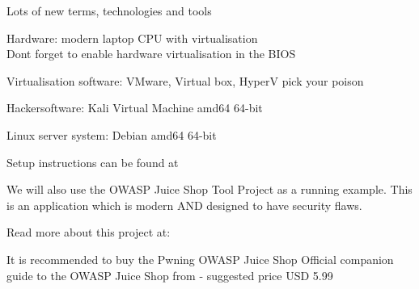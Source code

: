 \documentclass[Screen16to9,17pt]{foils}
\begin{document}
\begin{list2}
\item Lots of new terms, technologies and tools
\end{list2}



\begin{list2}
\item Hardware: modern laptop CPU with virtualisation\\
Dont forget to enable hardware virtualisation in the BIOS
\item Virtualisation software: VMware, Virtual box, HyperV pick your poison
\item Hackersoftware: Kali Virtual Machine amd64 64-bit 
\item Linux server system: Debian amd64 64-bit 
\item Setup instructions can be found at 
\end{list2}





We will also use the OWASP Juice Shop Tool Project as a running example. This is an application which is modern AND designed to have security flaws.

Read more about this project at: \\ 

It is recommended to buy the Pwning OWASP Juice Shop Official companion guide to the OWASP Juice Shop from  - suggested price USD 5.99



\myquestionspage
\end{document}
